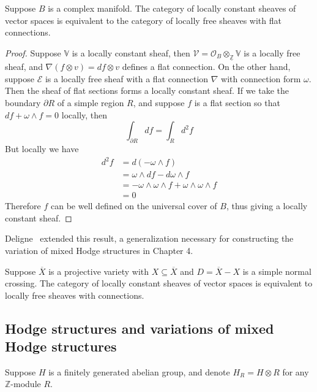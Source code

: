 \begin{theorem}
Suppose $B$ is a complex manifold. The category of locally constant sheaves of vector spaces is equivalent to the category of locally free sheaves with flat connections.
\end{theorem}

\begin{proof}
Suppose $\mathbb V$ is a locally constant sheaf, then $\mathcal V=\mathcal O_B\otimes_{\underline{\mathbb Z}}\mathbb V$ is a locally free sheaf, and $\nabla(f\otimes v)=df\otimes v$ defines a flat connection. On the other hand, suppose $\mathcal E$ is a locally free sheaf with a flat connection $\nabla$ with connection form $\omega$. Then the sheaf of flat sections forms a locally constant sheaf. If we take the boundary $\partial R$ of a simple region $R$, and suppose $f$ is a flat section so that $df+\omega\wedge f=0$ locally, then
\[
\int_{\partial R}df=\int_{R}d^2f
\]
But locally we have
\begin{align*}
d^2f&=d(-\omega\wedge f)\\
&=\omega\wedge df-d\omega\wedge f\\
&=-\omega\wedge\omega\wedge f+\omega\wedge\omega\wedge f\\
&=0
\end{align*}
Therefore $f$ can be well defined on the universal cover of $B$, thus giving a locally constant sheaf.
\end{proof}

Deligne~\cite{Deligne_EquationsDifferentiellesAPointsSinguliersReguliers} extended this result, a generalization necessary for constructing the variation of mixed Hodge structures in Chapter 4.

\begin{theorem}\label{thm: Deligne's thm flat connection <=> local system}
Suppose $\overline X$ is a projective variety with $X\subseteq\overline X$ and $D=\overline X-X$ is a simple normal crossing. The category of locally constant sheaves of vector spaces is equivalent to locally free sheaves with connections.
\end{theorem}

\subsection{Hodge structures and variations of mixed Hodge structures}

Suppose $H$ is a finitely generated abelian group, and denote $H_R=H\otimes R$ for any $\mathbb Z$-module $R$.

